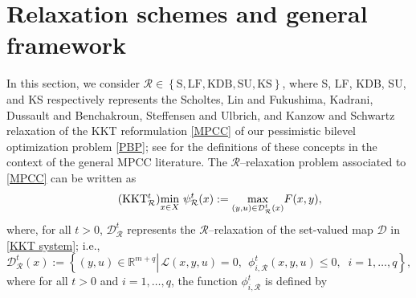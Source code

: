 \section{Relaxation schemes and general framework}\label{sec:relaxation schemes}
In this section, we consider $\mathcal{R}\in \left\{\mbox{S}, \mbox{LF}, \mbox{KDB}, \mbox{SU}, \mbox{KS}\right\}$, where S, LF, KDB, SU, and KS respectively represents the Scholtes, Lin and Fukushima, Kadrani, Dussault and Benchakroun, Steffensen and Ulbrich, and Kanzow and Schwartz relaxation of the KKT reformulation \eqref{MPCC} of our pessimistic bilevel optimization problem \eqref{PBP}; see \cite{HoheiselEtAlComparison2013} for the definitions of these concepts in the context of the general MPCC literature. The $\mathcal{R}$--relaxation problem associated to \eqref{MPCC} can be written as 
\begin{equation}\tag{KKT$^t_\mathcal{R}$}\label{KKT-RG}
\underset{x\in X}{\min}~\psi_{\mathcal{R}}^{t}(x):=\underset{(y,u)\in\mathcal{D}^{t}_{\mathcal{R}}(x)}{\max}F(x,y),
\end{equation}
where, for all $t>0$,  $\mathcal{D}^{t}_{\mathcal{R}}$ represents the $\mathcal{R}$--relaxation of the set-valued map $\mathcal{D}$ in \eqref{KKT system}; i.e., 
\begin{equation}\label{Dt}
\mathcal{D}^{t}_{\mathcal{R}}(x):=\left\{(y,u)\in\mathbb{R}^{m+q}\left\vert\,
\mathcal{L}(x,y,u)=0, \;\, \phi^t_{i, \mathcal{R}}(x, y, u)\leq 0, \;\; i=1, \ldots, q \right.\right\},
\end{equation}
where for all $t>0$ and $i=1, \ldots, q$, the function $\phi^t_{i, \mathcal{R}}$ is defined by
